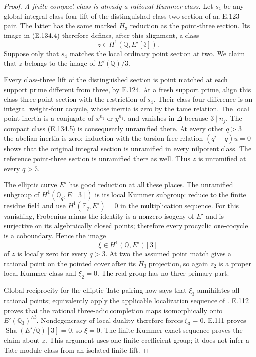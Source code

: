 \begin{proof}
\emph{A finite compact class is already a rational Kummer class.}
Let $s_4$ be any global integral class-four lift of
the distinguished class-two section of an E.123 pair.
The latter has the same marked $H_3$ reduction as the
point-three section. Its image in (E.134.4) therefore
defines, after this alignment, a class
\[
                         z\in H^1(\mathbb Q,E'[3]).
 \tag{E.134.5}
\]
Suppose only that $s_4$ matches the local ordinary
point section at two. We claim that $z$ belongs
to the image of $E'(\mathbb Q)/3$.

Every class-three lift of the distinguished section
is point matched at each support prime different
from three, by E.124. At a fresh support prime,
align this class-three point section with the
restriction of $s_4$. Their class-four difference
is an integral weight-four cocycle, whose inertia
is zero by the tame relation. The local point
inertia is a conjugate of $x^{n_j}$ or $y^{n_j}$,
and vanishes in $\Delta$ because $3\mid n_j$.
The compact class (E.134.5) is consequently
unramified there. At every other $q>3$ the
abelian inertia is zero; induction with the
torsion-free relation $(q^i-q)u=0$ shows that
the original integral section is unramified
in every nilpotent class. The reference point-three
section is unramified there as well. Thus $z$ is
unramified at every $q>3$.

The elliptic curve $E'$ has good reduction at all
these places. The unramified subgroup of
$H^1(\mathbb Q_q,E'[3])$ is its local Kummer
subgroup: reduce to the finite residue field and
use $H^1(\mathbb F_q,E')=0$ in the multiplication
sequence. For this vanishing, Frobenius minus the
identity is a nonzero isogeny of $E'$ and is
surjective on its algebraically closed points;
therefore every procyclic one-cocycle is a
coboundary. Hence the image
\[
                         \xi\in H^1(\mathbb Q,E')[3]
\]
of $z$ is locally zero for every $q>3$.
At two the assumed point match gives a rational
point on the pointed cover after its $H_3$
projection, so again $z_2$ is a proper local
Kummer class and $\xi_2=0$. The real group has
no three-primary part.

Global reciprocity for the elliptic Tate pairing
now says that $\xi_3$ annihilates all rational
points; equivalently apply the applicable
localization sequence of
\citet[I.6.26(b)]{CohMilneADT}.
E.112 proves that the rational three-adic
completion maps isomorphically onto
$E'(\mathbb Q_3)^{\wedge3}$. Nondegeneracy of
local duality therefore forces $\xi_3=0$.
E.111 proves $\operatorname{Sha}(E'/\mathbb Q)[3]=0$, so
$\xi=0$. The finite Kummer exact sequence
proves the claim about $z$.
This argument uses one finite coefficient group;
it does not infer a Tate-module class from an
isolated finite lift.


\end{proof}
